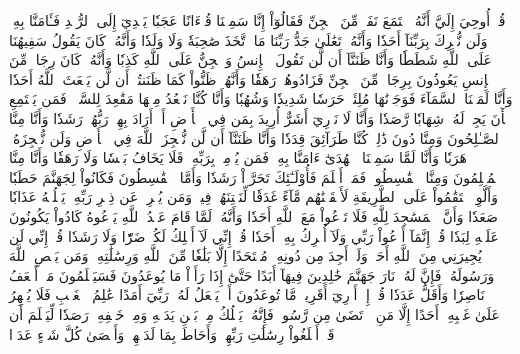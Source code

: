 قُلۡ أُوحِيَ إِلَيَّ أَنَّهُ ٱسۡتَمَعَ نَفَرٞ مِّنَ ٱلۡجِنِّ فَقَالُوٓاْ إِنَّا سَمِعۡنَا قُرۡءَانًا عَجَبٗا
يَهۡدِيٓ إِلَى ٱلرُّشۡدِ فَـَٔامَنَّا بِهِۦۖ وَلَن نُّشۡرِكَ بِرَبِّنَآ أَحَدٗا
وَأَنَّهُۥ تَعَٰلَىٰ جَدُّ رَبِّنَا مَا ٱتَّخَذَ صَٰحِبَةٗ وَلَا وَلَدٗا
وَأَنَّهُۥ كَانَ يَقُولُ سَفِيهُنَا عَلَى ٱللَّهِ شَطَطٗا
وَأَنَّا ظَنَنَّآ أَن لَّن تَقُولَ ٱلۡإِنسُ وَٱلۡجِنُّ عَلَى ٱللَّهِ كَذِبٗا
وَأَنَّهُۥ كَانَ رِجَالٞ مِّنَ ٱلۡإِنسِ يَعُوذُونَ بِرِجَالٖ مِّنَ ٱلۡجِنِّ فَزَادُوهُمۡ رَهَقٗا
وَأَنَّهُمۡ ظَنُّواْ كَمَا ظَنَنتُمۡ أَن لَّن يَبۡعَثَ ٱللَّهُ أَحَدٗا
وَأَنَّا لَمَسۡنَا ٱلسَّمَآءَ فَوَجَدۡنَٰهَا مُلِئَتۡ حَرَسٗا شَدِيدٗا وَشُهُبٗا
وَأَنَّا كُنَّا نَقۡعُدُ مِنۡهَا مَقَٰعِدَ لِلسَّمۡعِۖ فَمَن يَسۡتَمِعِ ٱلۡأٓنَ يَجِدۡ لَهُۥ شِهَابٗا رَّصَدٗا
وَأَنَّا لَا نَدۡرِيٓ أَشَرٌّ أُرِيدَ بِمَن فِي ٱلۡأَرۡضِ أَمۡ أَرَادَ بِهِمۡ رَبُّهُمۡ رَشَدٗا
وَأَنَّا مِنَّا ٱلصَّـٰلِحُونَ وَمِنَّا دُونَ ذَٰلِكَۖ كُنَّا طَرَآئِقَ قِدَدٗا
وَأَنَّا ظَنَنَّآ أَن لَّن نُّعۡجِزَ ٱللَّهَ فِي ٱلۡأَرۡضِ وَلَن نُّعۡجِزَهُۥ هَرَبٗا
وَأَنَّا لَمَّا سَمِعۡنَا ٱلۡهُدَىٰٓ ءَامَنَّا بِهِۦۖ فَمَن يُؤۡمِنۢ بِرَبِّهِۦ فَلَا يَخَافُ بَخۡسٗا وَلَا رَهَقٗا
وَأَنَّا مِنَّا ٱلۡمُسۡلِمُونَ وَمِنَّا ٱلۡقَٰسِطُونَۖ فَمَنۡ أَسۡلَمَ فَأُوْلَـٰٓئِكَ تَحَرَّوۡاْ رَشَدٗا
وَأَمَّا ٱلۡقَٰسِطُونَ فَكَانُواْ لِجَهَنَّمَ حَطَبٗا
وَأَلَّوِ ٱسۡتَقَٰمُواْ عَلَى ٱلطَّرِيقَةِ لَأَسۡقَيۡنَٰهُم مَّآءً غَدَقٗا
لِّنَفۡتِنَهُمۡ فِيهِۚ وَمَن يُعۡرِضۡ عَن ذِكۡرِ رَبِّهِۦ يَسۡلُكۡهُ عَذَابٗا صَعَدٗا
وَأَنَّ ٱلۡمَسَٰجِدَ لِلَّهِ فَلَا تَدۡعُواْ مَعَ ٱللَّهِ أَحَدٗا
وَأَنَّهُۥ لَمَّا قَامَ عَبۡدُ ٱللَّهِ يَدۡعُوهُ كَادُواْ يَكُونُونَ عَلَيۡهِ لِبَدٗا
قُلۡ إِنَّمَآ أَدۡعُواْ رَبِّي وَلَآ أُشۡرِكُ بِهِۦٓ أَحَدٗا
قُلۡ إِنِّي لَآ أَمۡلِكُ لَكُمۡ ضَرّٗا وَلَا رَشَدٗا
قُلۡ إِنِّي لَن يُجِيرَنِي مِنَ ٱللَّهِ أَحَدٞ وَلَنۡ أَجِدَ مِن دُونِهِۦ مُلۡتَحَدًا
إِلَّا بَلَٰغٗا مِّنَ ٱللَّهِ وَرِسَٰلَٰتِهِۦۚ وَمَن يَعۡصِ ٱللَّهَ وَرَسُولَهُۥ فَإِنَّ لَهُۥ نَارَ جَهَنَّمَ خَٰلِدِينَ فِيهَآ أَبَدًا
حَتَّىٰٓ إِذَا رَأَوۡاْ مَا يُوعَدُونَ فَسَيَعۡلَمُونَ مَنۡ أَضۡعَفُ نَاصِرٗا وَأَقَلُّ عَدَدٗا
قُلۡ إِنۡ أَدۡرِيٓ أَقَرِيبٞ مَّا تُوعَدُونَ أَمۡ يَجۡعَلُ لَهُۥ رَبِّيٓ أَمَدًا
عَٰلِمُ ٱلۡغَيۡبِ فَلَا يُظۡهِرُ عَلَىٰ غَيۡبِهِۦٓ أَحَدًا
إِلَّا مَنِ ٱرۡتَضَىٰ مِن رَّسُولٖ فَإِنَّهُۥ يَسۡلُكُ مِنۢ بَيۡنِ يَدَيۡهِ وَمِنۡ خَلۡفِهِۦ رَصَدٗا
لِّيَعۡلَمَ أَن قَدۡ أَبۡلَغُواْ رِسَٰلَٰتِ رَبِّهِمۡ وَأَحَاطَ بِمَا لَدَيۡهِمۡ وَأَحۡصَىٰ كُلَّ شَيۡءٍ عَدَدَۢا